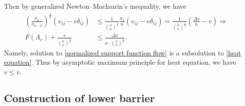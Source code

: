 \documentclass[reqno]{amsart}
\theoremstyle{remark}
\theoremstyle{definition}
\numberwithin{equation}{section}
\begin{document}
Then by generalized Newton--Maclaurin's inequality, we have
\begin{align*}
    \left( \frac{\sigma_n}{\sigma_{n-k}} \right)^{\frac{1}{k}} \left( v_{ij}-v\delta_{ij} \right) &\leqslant \frac{1}{\binom{n}{k}^{\frac{1}{k}}} \frac{\sigma_1}{n} \left( v_{ij}-v\delta_{ij} \right)
    = \frac{1}{\binom{n}{k}^{\frac{1}{k}}} \left( \frac{\Delta v}{n} - v \right) \Rightarrow \\
    F(\Lambda_{v}) + \frac{v}{\binom{n}{k}^{\frac{1}{k}}} &\leqslant \frac{\Delta v}{n \cdot \binom{n}{k}^{\frac{1}{k}}}.
\end{align*}
Namely, solution to \eqref{normalized support function flow} is a subsolution to \eqref{heat equation}. Thus by asymptotic maximum principle for heat equation, we have $v \leqslant \overline{v}$.


\subsection{Construction of lower barrier}\label{subsolution to the approximate problem}
\end{document}
